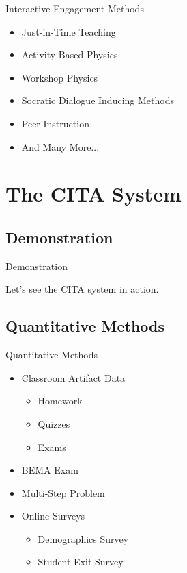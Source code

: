 \documentclass{beamer}
\begin{document}
\begin{frame}{Interactive Engagement Methods}
\begin{itemize}
\item Just-in-Time Teaching
\item Activity Based Physics
\item Workshop Physics
\item Socratic Dialogue Inducing Methods
\item Peer Instruction
\item And Many More...
\end{itemize}
\end{frame}

\section{The CITA System}

\subsection*{Demonstration}

\begin{frame}{Demonstration}
\begin{center}
Let's see the CITA system in action.
\end{center}
\end{frame}

\subsection*{Quantitative Methods}

\begin{frame}{Quantitative Methods}
\begin{itemize}
\item Classroom Artifact Data
\begin{itemize}
\item Homework
\item Quizzes
\item Exams
\end{itemize}
\item BEMA Exam
\item Multi-Step Problem
\item Online Surveys
\begin{itemize}
\item Demographics Survey
\item Student Exit Survey
\end{itemize}
\end{itemize}
\end{frame}
\end{document}

